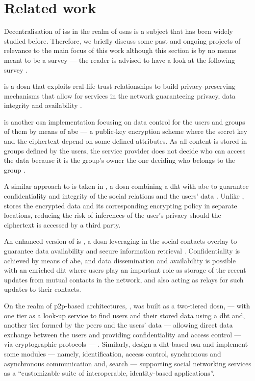 \section{Related work}
    \label{section:thesis:related-work}
Decentralisation of \acp{is} in the realm of \acp{osn} is a subject that has been 
widely studied before. Therefore, we briefly discuss some past and ongoing projects 
of relevance to the main focus of this work although this section is by no means 
meant to be a survey --- the reader is advised to have a look at the following 
survey \cite{PaulFS14}.

\Safebook is a \ac{dosn} that exploits real-life trust relationships to build privacy-preserving 
mechanisms that allow for services in the network guaranteeing privacy, data integrity 
and availability \cite{CutilloMS09}. 

\Persona is another \ac{osn} implementation focusing on data control for the users 
and groups of them by means of \ac{abe} --- a public-key encryption scheme where 
the secret key and the ciphertext depend on some defined attributes. As all content 
is stored in groups defined by the users, the service provider does not decide who 
can access the data because it is the group's owner the one deciding who belongs 
to the group \cite{BadenBSBS09}.

A similar approach to \Persona is taken in \DECENT, a \ac{dosn} combining a \ac{dht} 
with \ac{abe} to guarantee confidentiality and integrity of the social relations and 
the users' data \cite{JahidNMBK12}. Unlike \Persona, \DECENT stores the encrypted 
data and its corresponding encrypting policy in separate locations, reducing the 
risk of inferences of the user's privacy should the ciphertext is accessed by a 
third party.

An enhanced version of \DECENT is \Cachet, a \ac{dosn} leveraging in the social 
contacts overlay to guarantee data availability and secure information retrieval 
\cite{NilizadehJMBK12}. Confidentiality is achieved by means of \ac{abe}, and data 
dissemination and availability is possible with an enriched \ac{dht} where users 
play an important role as storage of the recent updates from mutual contacts in 
the network, and also acting as relays for such updates to their contacts.

On the realm of \ac{p2p}-based architectures, \PeerSoN, was built as a two-tiered 
\ac{dosn},  --- with one tier as a look-up service to find users and their stored 
data using a \ac{dht} and, another tier formed by the peers and the users' data 
--- allowing direct data exchange between the users and providing confidentiality 
and access control --- via cryptographic protocols --- \cite{BucheggerSVD09}. Similarly, 
\cite{AielloR10} design a \ac{dht}-based \ac{osn} and implement some modules --- 
namely, identification, access control, synchronous and asynchronous communication 
and, search --- supporting social networking services as a ``customizable suite 
of interoperable, identity-based applications''.

